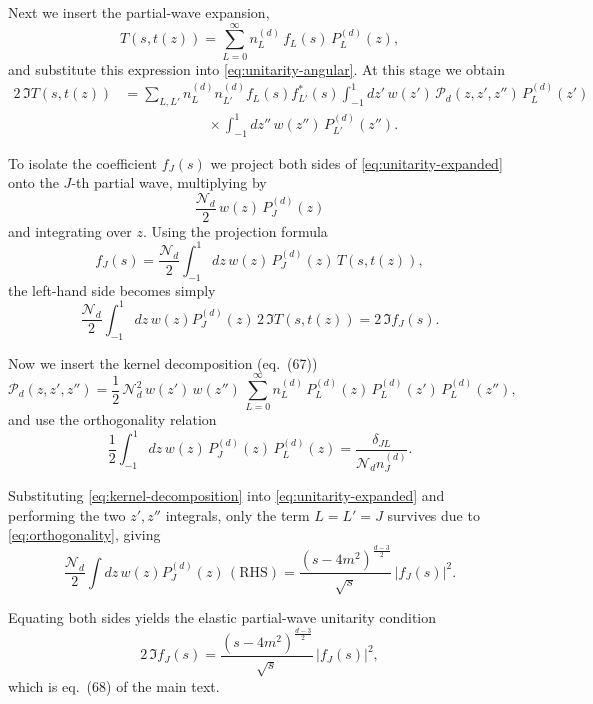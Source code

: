 \documentclass[12pt]{article}
\begin{document}
Next we insert the partial-wave expansion,
%
\begin{equation}
T(s,t(z))=\sum_{L=0}^\infty n^{(d)}_L\, f_L(s)\,P_L^{(d)}(z),
\label{eq:pw-expansion}
\end{equation}
%
and substitute this expression into \eqref{eq:unitarity-angular}.  
At this stage we obtain
%
\begin{align}
2\,\Im T(s,t(z))
&=
\sum_{L,L'} 
n^{(d)}_L n^{(d)}_{L'} f_L(s) f_{L'}^*(s)
\int_{-1}^1\!dz'\,w(z')\,\mathcal P_d(z,z',z'')\,P_L^{(d)}(z')
\nonumber\\
&\qquad\qquad\qquad\times
\int_{-1}^1\!dz''\,w(z'')\,P_{L'}^{(d)}(z'').
\label{eq:unitarity-expanded}
\end{align}

To isolate the coefficient $f_J(s)$ we project both sides of 
\eqref{eq:unitarity-expanded} onto the $J$-th partial wave,
multiplying by
%
\[
\frac{\mathcal N_d}{2}\, w(z)\,P_J^{(d)}(z)
\]
%
and integrating over $z$.  
Using the projection formula
%
\begin{equation}
f_J(s)=\frac{\mathcal N_d}{2}\int_{-1}^1 dz\,
w(z)\,P_J^{(d)}(z)\,T(s,t(z)),
\label{eq:projection}
\end{equation}
%
the left-hand side becomes simply
%
\[
\frac{\mathcal N_d}{2}
\int_{-1}^1 dz\,w(z)P_J^{(d)}(z)\,2\,\Im T(s,t(z))
=2\,\Im f_J(s).
\]

Now we insert the kernel decomposition (eq.~(67))
%
\begin{equation}
\mathcal P_d(z,z',z'')
=\frac12\,\mathcal N_d^2\,w(z')\,w(z'')\,
\sum_{L=0}^\infty n_L^{(d)}\,
P_L^{(d)}(z)\,P_L^{(d)}(z')\,P_L^{(d)}(z''),
\label{eq:kernel-decomposition}
\end{equation}
%
and use the orthogonality relation
%
\begin{equation}
\frac12\int_{-1}^1dz\, w(z)\,P_J^{(d)}(z)\,P_L^{(d)}(z)
=\frac{\delta_{JL}}{\mathcal N_d n_J^{(d)}}.
\label{eq:orthogonality}
\end{equation}

Substituting \eqref{eq:kernel-decomposition} into 
\eqref{eq:unitarity-expanded} and performing the two $z',z''$ integrals,
only the term $L=L'=J$ survives due to \eqref{eq:orthogonality}, giving
%
\[
\frac{\mathcal N_d}{2}\int dz\,w(z)P_J^{(d)}(z)\,(\text{RHS})
=
\frac{(s-4m^2)^{\frac{d-3}{2}}}{\sqrt{s}}
\,|f_J(s)|^2.
\]

Equating both sides yields the elastic partial-wave unitarity condition
%
\begin{equation}
2\,\Im f_J(s)
=
\frac{(s-4m^2)^{\frac{d-3}{2}}}{\sqrt{s}}\,
|f_J(s)|^2,
\label{eq:pw-unitarity}
\end{equation}
%
which is eq.~(68) of the main text.
\newpage
\end{document}
